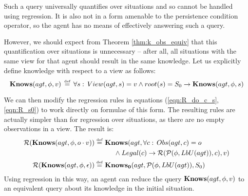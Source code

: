 Such a query universally quantifies over situations and so cannot
be handled using regression. It is also not in a form amenable to
the persistence condition operator, so the agent has no means of effectively
answering such a query.

However, we should expect from Theorem \ref{thm:k_obs_equiv} that
this quantification over situations is unnecessary -- after all, all
situations with the same view for that agent should result in the
same knowledge. Let us explicitly define knowledge with respect to
a view as follows:\[
\mathbf{Knows}(agt,\phi,v)\,\stackrel{\mbox{\tiny def}}{=}\,\forall s:\, View(agt,s)=v\wedge root(s)=S_{0}\rightarrow\mathbf{Knows}(agt,\phi,s)\]


We can then modify the regression rules in equations (\ref{eqn:R_do_c_s},\ref{eqn:R_s0})
to work directly on formulae of this form. The resulting rules are
actually simpler than for regression over situations, as there are
no empty observations in a view. The result is:\begin{align}
\mathcal{R}(\mathbf{Knows}(agt,\phi,o\cdot v))\stackrel{\mbox{\tiny def}}{=}\,\, & \mathbf{Knows}(agt,\forall c:\, Obs(agt,c)=o\nonumber \\
 & \,\,\,\,\,\,\,\,\wedge Legal(c)\rightarrow\mathcal{R}(\mathcal{P}(\phi,LbU(agt)),c),v)\label{eq:Knowledge:Reg_V_O}\\
\mathcal{R}(\mathbf{Knows}(agt,\phi,\epsilon))\stackrel{\mbox{\tiny def}}{=}\,\, & \mathbf{Knows_{0}}(agt,\mathcal{P}(\phi,LbU(agt)),S_{0})\label{eq:Knowldge:Reg_V_E}\end{align}
 Using regression in this way, an agent can reduce the query $\mathbf{Knows}(agt,\phi,v)$
to an equivalent query about its knowledge in the initial situation.

